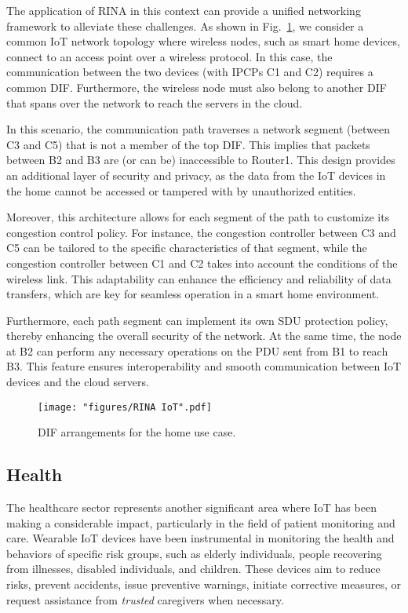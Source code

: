 \documentclass{ieeeaccess}
\begin{document}
The application of RINA in this context can provide a unified networking framework to alleviate these challenges. As shown in Fig.~\ref{fig:rina-iot}, we consider a common IoT network topology where wireless nodes, such as smart home devices, connect to an access point over a wireless protocol. In this case, the communication between the two devices (with IPCPs C1 and C2) requires a common DIF. Furthermore, the wireless node must also belong to another DIF that spans over the network to reach the servers in the cloud.

In this scenario, the communication path traverses a network segment (between C3 and C5) that is not a member of the top DIF. This implies that packets between B2 and B3 are (or can be) inaccessible to Router1. This design provides an additional layer of security and privacy, as the data from the IoT devices in the home cannot be accessed or tampered with by unauthorized entities.

Moreover, this architecture allows for each segment of the path to customize its congestion control policy. For instance, the congestion controller between C3 and C5 can be tailored to the specific characteristics of that segment, while the congestion controller between C1 and C2 takes into account the conditions of the wireless link. This adaptability can enhance the efficiency and reliability of data transfers, which are key for seamless operation in a smart home environment.

Furthermore, each path segment can implement its own SDU protection policy, thereby enhancing the overall security of the network. At the same time, the node at B2 can perform any necessary operations on the PDU sent from B1 to reach B3. This feature ensures interoperability and smooth communication between IoT devices and the cloud servers.





\begin{figure}[!t]
	\centering
	\texttt{[image: "figures/RINA IoT".pdf]}
	\caption{DIF arrangements for the home use case.}
	\label{fig:rina-iot}
\end{figure}

\subsection{Health}

The healthcare sector represents another significant area where IoT has been making a considerable impact, particularly in the field of patient monitoring and care. Wearable IoT devices have been instrumental in monitoring the health and behaviors of specific risk groups, such as elderly individuals, people recovering from illnesses, disabled individuals, and children. These devices aim to reduce risks, prevent accidents, issue preventive warnings, initiate corrective measures, or request assistance from \textit{trusted} caregivers when necessary.
\end{document}
